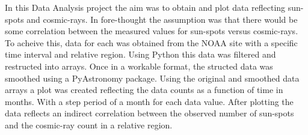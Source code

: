 In this Data Analysis project the aim was to obtain and plot data reflecting
sun-spots and cosmic-rays. In fore-thought the assumption was that there would
be some correlation between the measured values for sun-spots versus 
cosmic-rays. To acheive this, data for each was obtained from the NOAA site
with a specific time interval and relative region. 
Using Python this data was filtered and restructed into arrays. Once in a
workable format, the structed data was smoothed using a PyAstronomy package.
Using the original and smoothed data arrays a plot was created reflecting the
data counts as a function of time in months. With a step period of a month for
each data value. After plotting the data reflects an indirect correlation 
between the observed number of sun-spots and the cosmic-ray count in a relative
region. 
